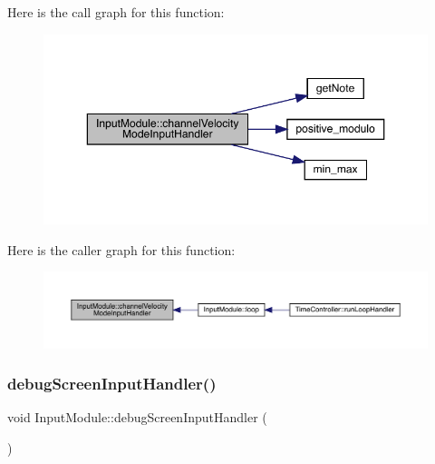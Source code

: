 Here is the call graph for this function\+:
\nopagebreak
\begin{figure}[H]
\begin{center}
\leavevmode
\includegraphics[width=350pt]{class_input_module_a30c140bcc298b2c7c382ef290e77071f_cgraph}
\end{center}
\end{figure}
Here is the caller graph for this function\+:
\nopagebreak
\begin{figure}[H]
\begin{center}
\leavevmode
\includegraphics[width=350pt]{class_input_module_a30c140bcc298b2c7c382ef290e77071f_icgraph}
\end{center}
\end{figure}
\mbox{\label{class_input_module_a341016de304d4ac105a9f5c98a76a853}} 
\subsubsection{\texorpdfstring{debug\+Screen\+Input\+Handler()}{debugScreenInputHandler()}}
{\footnotesize\ttfamily void Input\+Module\+::debug\+Screen\+Input\+Handler (\begin{DoxyParamCaption}{ }\end{DoxyParamCaption})}

